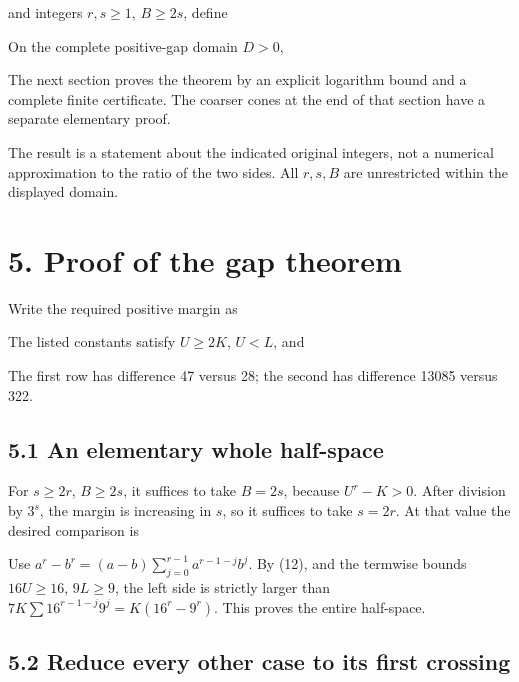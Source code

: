 
and integers \(r,s\ge1\), \(B\ge2s\), define


On the complete positive-gap domain \(D>0\),


The next section proves the theorem by an explicit logarithm bound and a
complete finite certificate. The coarser cones at the end of that
section have a separate elementary proof.

The result is a statement about the indicated original integers, not a
numerical approximation to the ratio of the two sides. All \(r,s,B\) are
unrestricted within the displayed domain.

\section{5. Proof of the gap theorem}

Write the required positive margin as


The listed constants satisfy \(U\ge2K\), \(U<L\), and


The first row has difference 47 versus 28; the second has difference
13085 versus 322.

\subsection{5.1 An elementary whole half-space}

For \(s\ge2r\), \(B\ge2s\), it suffices to take \(B=2s\), because
\(U^r-K>0\). After division by \(3^s\), the margin is increasing in
\(s\), so it suffices to take \(s=2r\). At that value the desired
comparison is


Use \(a^r-b^r=(a-b)\sum_{j=0}^{r-1}a^{r-1-j}b^j\). By (12), and the
termwise bounds \(16U\ge16\), \(9L\ge9\), the left side is strictly
larger than \(7K\sum16^{r-1-j}9^j=K(16^r-9^r)\). This proves the entire
half-space.

\subsection{5.2 Reduce every other case to its first crossing}

